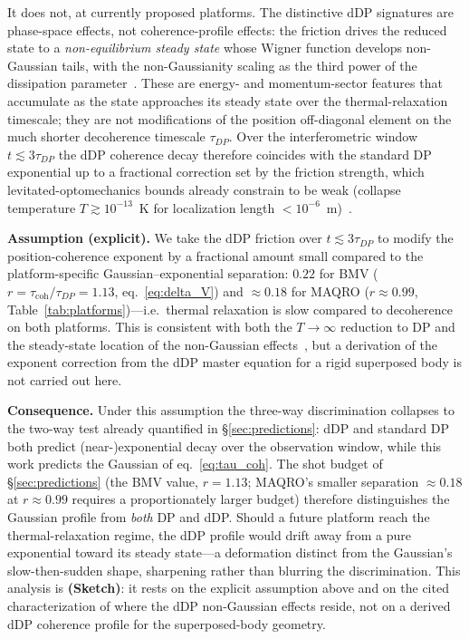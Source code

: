 \documentclass[12pt,a4paper]{article}
\theoremstyle{remark}
\begin{document}
It does not, at currently proposed platforms. The distinctive dDP signatures are
phase-space effects, not coherence-profile effects: the friction drives the reduced state
to a \emph{non-equilibrium steady state} whose Wigner function develops non-Gaussian tails,
with the non-Gaussianity scaling as the third power of the dissipation
parameter~\cite{melo_dissipative}. These are energy- and momentum-sector features that
accumulate as the state approaches its steady state over the thermal-relaxation timescale;
they are not modifications of the position off-diagonal element on the much shorter
decoherence timescale $\tau_{DP}$. Over the interferometric window $t \lesssim 3\tau_{DP}$
the dDP coherence decay therefore coincides with the standard DP exponential up to a
fractional correction set by the friction strength, which levitated-optomechanics bounds
already constrain to be weak (collapse temperature $T \gtrsim 10^{-13}$~K for localization
length $< 10^{-6}$~m)~\cite{ddp_bounds}.

\textbf{Assumption (explicit).} We take the dDP friction over $t \lesssim 3\tau_{DP}$ to
modify the position-coherence exponent by a fractional amount small compared to the
platform-specific Gaussian--exponential separation: $0.22$ for BMV ($r = \tau_{\text{coh}}/\tau_{DP} = 1.13$,
eq.~\eqref{eq:delta_V}) and $\approx 0.18$ for MAQRO ($r \approx 0.99$,
Table~\ref{tab:platforms})---i.e.\ thermal relaxation is slow compared to decoherence on
both platforms. This is consistent with both
the $T\to\infty$ reduction to DP and the steady-state location of the non-Gaussian
effects~\cite{melo_dissipative}, but a derivation of the exponent correction from the dDP
master equation for a rigid superposed body is not carried out here.

\textbf{Consequence.} Under this assumption the three-way discrimination collapses to the
two-way test already quantified in \S\ref{sec:predictions}: dDP and standard DP both
predict (near-)exponential decay over the observation window, while this work predicts the
Gaussian of eq.~\eqref{eq:tau_coh}. The shot budget of \S\ref{sec:predictions} (the BMV
value, $r=1.13$; MAQRO's smaller separation $\approx 0.18$ at $r\approx 0.99$ requires a
proportionately larger budget) therefore distinguishes the Gaussian profile from \emph{both}
DP and dDP. Should a future platform
reach the thermal-relaxation regime, the dDP profile would drift away from a pure
exponential toward its steady state---a deformation distinct from the Gaussian's
slow-then-sudden shape, sharpening rather than blurring the discrimination. This analysis
is \textbf{(Sketch)}: it rests on the explicit assumption above and on the cited
characterization of where the dDP non-Gaussian effects reside, not on a derived dDP
coherence profile for the superposed-body geometry.
\end{document}

